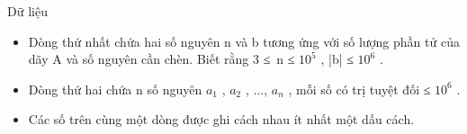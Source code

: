 Dữ liệu  
\begin{itemize}
	\item     Dòng thứ nhất chứa hai số nguyên n và b tương ứng với số lượng phần tử của dãy A và số nguyên cần chèn. Biết rằng 3 ≤ n ≤ $10^{5}$    , |b| ≤ $10^{6}$    .   
	\item     Dòng thứ hai chứa n số nguyên $a_{1}$    , $a_{2}$    , ..., $a_{n}$    , mỗi số có trị tuyệt đối ≤ $10^{6}$    .   
	\item     Các số trên cùng một dòng được ghi cách nhau ít nhất một dấu cách.   
\end{itemize}